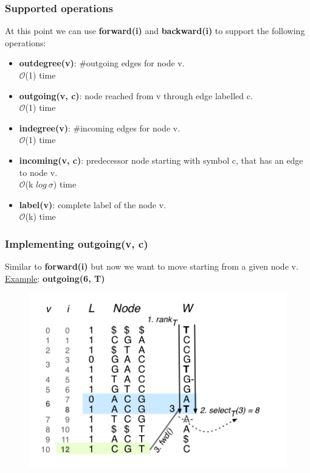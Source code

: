 \begin{frame}
\frametitle{Supported operations}
At this point we can use \textbf{forward(i)} and \textbf{backward(i)} to support the following operations:
\begin{itemize}
	\item \textbf{outdegree(v)}: \#outgoing edges for node v.\\ $\mathcal{O}$(1) time
	\item \textbf{outgoing(v, c)}: node reached from v through edge labelled c.\\ $\mathcal{O}$(1) time
	\item \textbf{indegree(v)}: \#incoming edges for node v.\\ $\mathcal{O}$(1) time
	\item \textbf{incoming(v, c)}:  predecessor node starting with symbol c, that has an edge to node v.\\ $\mathcal{O}$(k $log\ \sigma$) time
	\item \textbf{label(v)}: complete label of the node v.\\ $\mathcal{O}$(k) time
\end{itemize}
\end{frame}

\begin{frame}
\frametitle{Implementing outgoing(v, c)}
Similar to \textbf{forward(i)} but now we want to move starting from a given node v.
\\ \medskip
\underline{Example}: \textbf{outgoing(6, T)}
\begin{figure}
	\includegraphics[scale=0.4]{img/outgoing.png}
\end{figure}

\end{frame}

